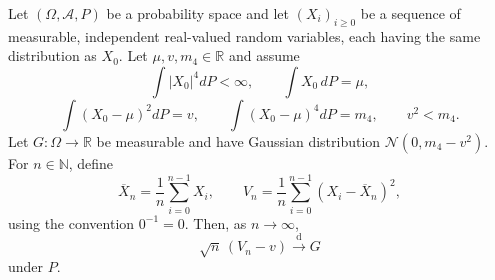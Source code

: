 \begin{theorem}
Let $(\Omega,\mathcal A,P)$ be a probability space and let
$(X_i)_{i\ge0}$ be a sequence of measurable, independent real-valued random
variables, each having the same distribution as $X_0$.  Let
$\mu,v,m_4\in\mathbb R$ and assume
\[
 \int |X_0|^4dP<\infty,\qquad
 \int X_0\,dP=\mu,
\]
\[
 \int(X_0-\mu)^2dP=v,\qquad
 \int(X_0-\mu)^4dP=m_4,\qquad
 v^2<m_4.
\]
Let $G:\Omega\to\mathbb R$ be measurable and have Gaussian distribution
$\mathcal N(0,m_4-v^2)$.  For $n\in\mathbb N$, define
\[
 \overline X_n=\frac1n\sum_{i=0}^{n-1}X_i,
 \qquad
 V_n=\frac1n\sum_{i=0}^{n-1}(X_i-\overline X_n)^2,
\]
using the convention $0^{-1}=0$.  Then, as $n\to\infty$,
\[
  \sqrt n\,(V_n-v)\xrightarrow{\mathrm d}G
\]
under $P$.
\end{theorem}
